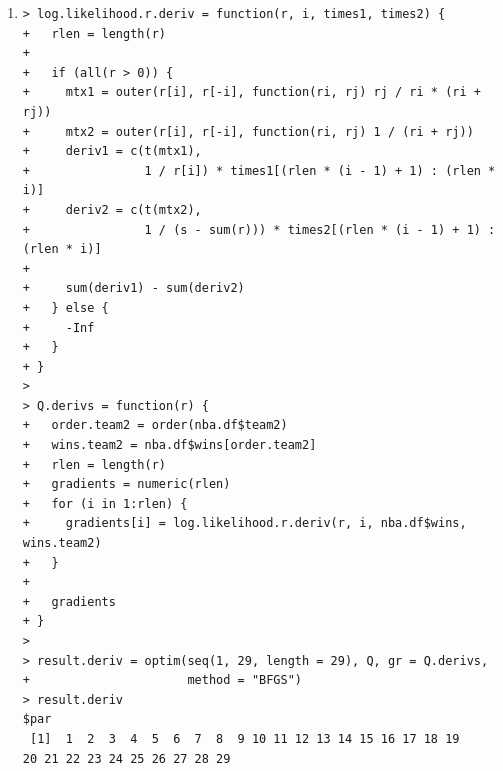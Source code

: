 \documentclass[11pt]{report}
\theoremstyle{definition}
\theoremstyle{remark}
\begin{document}
\begin{enumerate}
\begin{enumerate}
\begin{verbatim}
$convergence
[1] 0

$message
NULL

> 
> ratio = 100 / result$par[which.max(result$par)]
> r.value = result$par * ratio
> rr.value = c (r.value, (s - sum(result$par)) * ratio)
> rr.value
 [1]  22.620297  38.531300   6.638514  16.320396  20.775979  
35.204884  14.654177  20.714760  17.203279
[10] 100.000000  46.320893  21.441200  37.367766   9.941587  
25.149031  21.093608  21.970918  13.473837
[19]  15.524833  12.469774  30.404938  11.200987  10.538221   
8.870722  21.991566  14.065441  65.676566
[28]  34.250068  36.776521  30.966569
> 
> rank.table = data.frame(nba.names, rr.value, stringsAsFactors = FALSE)
> ordered.rank = rank.table[order(rank.table$rr.value, decreasing = TRUE),]
> colnames(ordered.rank) = c("name", "rank")
> rownames(ordered.rank) = 1:30
> ordered.rank
                     name       rank
1   Golden State Warriors 100.000000
2       San Antonio Spurs  65.676566
3         Houston Rockets  46.320893
4          Boston Celtics  38.531300
5    Los Angeles Clippers  37.367766
6               Utah Jazz  36.776521
7     Cleveland Cavaliers  35.204884
8         Toronto Raptors  34.250068
9      Washington Wizards  30.966569
10  Oklahoma City Thunder  30.404938
11      Memphis Grizzlies  25.149031
12          Atlanta Hawks  22.620297
13 Portland Trail Blazers  21.991566
14        Milwaukee Bucks  21.970918
15         Indiana Pacers  21.441200
16             Miami Heat  21.093608
17          Chicago Bulls  20.775979
18         Denver Nuggets  20.714760
19        Detroit Pistons  17.203279
20      Charlotte Hornets  16.320396
21   New Orleans Pelicans  15.524833
22       Dallas Mavericks  14.654177
23       Sacramento Kings  14.065441
24 Minnesota Timberwolves  13.473837
25        New York Knicks  12.469774
26          Orlando Magic  11.200987
27     Philadelphia 76ers  10.538221
28     Los Angeles Lakers   9.941587
29           Phoenix Suns   8.870722
30          Brooklyn Nets   6.638514
>  \end{verbatim}
 	    \item[(b)] \begin{verbatim}> log.likelihood.r.deriv = function(r, i, times1, times2) {
+   rlen = length(r)
+   
+   if (all(r > 0)) {
+     mtx1 = outer(r[i], r[-i], function(ri, rj) rj / ri * (ri + rj))
+     mtx2 = outer(r[i], r[-i], function(ri, rj) 1 / (ri + rj))
+     deriv1 = c(t(mtx1), 
+                1 / r[i]) * times1[(rlen * (i - 1) + 1) : (rlen * i)]
+     deriv2 = c(t(mtx2), 
+                1 / (s - sum(r))) * times2[(rlen * (i - 1) + 1) : (rlen * i)]
+     
+     sum(deriv1) - sum(deriv2)
+   } else {
+     -Inf
+   }
+ }
> 
> Q.derivs = function(r) {
+   order.team2 = order(nba.df$team2)
+   wins.team2 = nba.df$wins[order.team2]
+   rlen = length(r)
+   gradients = numeric(rlen)
+   for (i in 1:rlen) {
+     gradients[i] = log.likelihood.r.deriv(r, i, nba.df$wins, wins.team2)
+   }
+   
+   gradients
+ }
> 
> result.deriv = optim(seq(1, 29, length = 29), Q, gr = Q.derivs, 
+                      method = "BFGS")
> result.deriv
$par
 [1]  1  2  3  4  5  6  7  8  9 10 11 12 13 14 15 16 17 18 19 
20 21 22 23 24 25 26 27 28 29


\end{verbatim}
\end{enumerate}
\end{enumerate}
\end{document}
